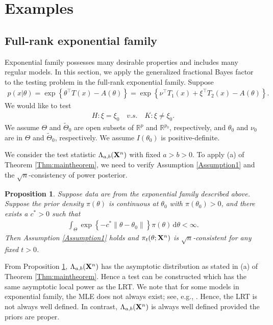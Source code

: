 \documentclass[11pt]{article}
\newcommand{\myT}{\intercal}
\theoremstyle{plain}
\newtheorem{proposition}{\quad\quad Proposition}
\theoremstyle{definition}
\theoremstyle{remark}
\begin{document}
    \section{Examples} \label{sec:examples}

    \subsection{Full-rank exponential family}\label{sec:exponentialFamily}
Exponential family possesses many desirable properties and includes many regular models.
In this section, we apply the generalized fractional Bayes factor to the testing problem in the full-rank exponential family.
Suppose 
\begin{align*}
    p(x|\theta)
    =\exp \left\{ \theta^\myT  T(x)-A(\theta) \right\}
    =\exp \left\{ \nu^\myT  T_1(x) + \xi^\myT T_2 (x) -A(\theta) \right\}
    .
\end{align*}
We would like to test
\begin{align*}
    H:\xi= \xi_0 \quad v.s.\quad K: \xi\neq \xi_0. 
\end{align*}
We assume $\Theta$ and $\tilde{\Theta}_0$ are open subsets of $\mathbb{R}^p$ and $\mathbb R^{p_0}$, respectively,
and $\theta_0$ and $\nu_0$ are in $\Theta$ and $\tilde{\Theta}_0$, respectively.
We assume $I(\theta_0)$ is positive-definite.

We consider the test statistic $\Lambda_{a,b}(\mathbf{X}^n)$ with fixed $a>b> 0$.
To apply (a) of Theorem \ref{Thm:maintheorem},
we need to verify Assumption \ref{Assumption1} and the $\sqrt n$-consistency of power posterior.
\begin{proposition}\label{exponentialCon}
    Suppose data are from the exponential family described above.
    Suppose the prior density $\pi(\theta)$ is continuous at $\theta_0$ with $\pi(\theta_0) > 0$, and there exists a $c^* > 0$ such that
    \begin{align*}
        \int_{\Theta} 
        \exp\left\{- c^* \|\theta-\theta_0\|  \right\}
        \pi(\theta)\, \mathrm d\theta
        < \infty
        .
    \end{align*}
    Then Assumption \ref{Assumption1} holds and $\pi_{t}(\theta ;\mathbf{X}^{n})$ is $\sqrt n$-consistent for any fixed $t>0$.
\end{proposition}
From Proposition \ref{exponentialCon}, $\Lambda_{a,b}(\mathbf{X}^n)$ has the asymptotic distribution as stated in (a) of Theorem \ref{Thm:maintheorem}.
Hence a test can be constructed which has the same asymptotic local power as the LRT.
We note that for some models in exponential family, the MLE does not always exist; see, e.g., \cite{Rinaldo2013}.
Hence, the LRT is not always well defined.
In contrast, $\Lambda_{a,b}(\mathbf{X}^n)$ is always well defined provided the priors are proper.
\end{document}
